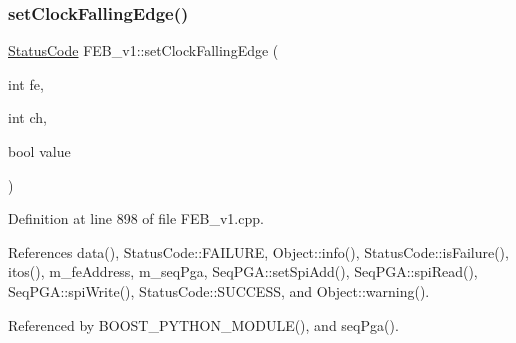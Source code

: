 \subsubsection{\texorpdfstring{set\+Clock\+Falling\+Edge()}{setClockFallingEdge()}}
{\footnotesize\ttfamily \hyperlink{classStatusCode}{Status\+Code} F\+E\+B\+\_\+v1\+::set\+Clock\+Falling\+Edge (\begin{DoxyParamCaption}\item[{int}]{fe,  }\item[{int}]{ch,  }\item[{bool}]{value }\end{DoxyParamCaption})}



Definition at line 898 of file F\+E\+B\+\_\+v1.\+cpp.



References data(), Status\+Code\+::\+F\+A\+I\+L\+U\+RE, Object\+::info(), Status\+Code\+::is\+Failure(), itos(), m\+\_\+fe\+Address, m\+\_\+seq\+Pga, Seq\+P\+G\+A\+::set\+Spi\+Add(), Seq\+P\+G\+A\+::spi\+Read(), Seq\+P\+G\+A\+::spi\+Write(), Status\+Code\+::\+S\+U\+C\+C\+E\+SS, and Object\+::warning().



Referenced by B\+O\+O\+S\+T\+\_\+\+P\+Y\+T\+H\+O\+N\+\_\+\+M\+O\+D\+U\+L\+E(), and seq\+Pga().


